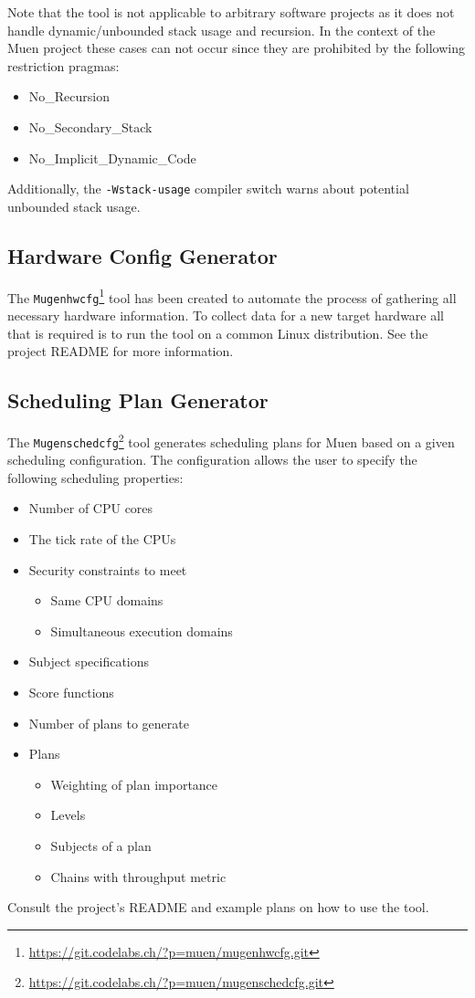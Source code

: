 \documentclass[a4paper,twoside,titlepage]{article}
\begin{document}
Note that the tool is not applicable to arbitrary software projects
as it does not handle dynamic/unbounded stack usage and recursion. In the
context of the Muen project these cases can not occur since they are prohibited
by the following restriction pragmas:
\begin{itemize}
	\item No\_Recursion
	\item No\_Secondary\_Stack
	\item No\_Implicit\_Dynamic\_Code
\end{itemize}

Additionally, the \texttt{-Wstack-usage} compiler switch warns about potential
unbounded stack usage.

\subsection{Hardware Config Generator}
\label{sec:mugenhwcfg}
The
\texttt{Mugenhwcfg}\footnote{\url{https://git.codelabs.ch/?p=muen/mugenhwcfg.git}}
tool has been created to automate the process of gathering all necessary
hardware information. To collect data for a new target hardware all that is
required is to run the tool on a common Linux distribution. See the project
README for more information.

\subsection{Scheduling Plan Generator}
\label{sec:mugenschedcfg}
The
\texttt{Mugenschedcfg}\footnote{\url{https://git.codelabs.ch/?p=muen/mugenschedcfg.git}}
tool generates scheduling plans for Muen based on a given scheduling
configuration.  The configuration allows the user to specify the following
scheduling properties:

\begin{itemize}
	\item Number of CPU cores
	\item The tick rate of the CPUs
	\item Security constraints to meet
	\begin{itemize}
		\item Same CPU domains
		\item Simultaneous execution domains
	\end{itemize}
	\item Subject specifications
	\item Score functions
	\item Number of plans to generate
	\item Plans
	\begin{itemize}
		\item Weighting of plan importance
		\item Levels
		\item Subjects of a plan
		\item Chains with throughput metric
	\end{itemize}
\end{itemize}

Consult the project's README and example plans on how to use the tool.
\end{document}
